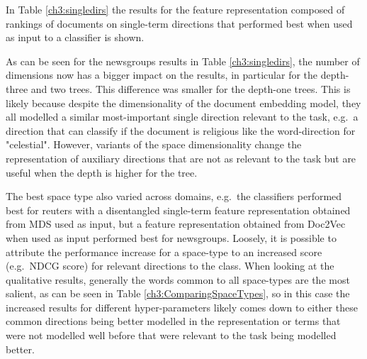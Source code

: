 In Table \ref{ch3:singledirs} the results for the feature representation composed of rankings of documents on single-term directions that performed best when used as input to a classifier is shown.



 
 As can be seen for the newsgroups results in Table \ref{ch3:singledirs}, the number of dimensions now has a bigger impact on the results, in particular for the depth-three and two trees. This difference was smaller for the depth-one trees. This is likely because despite the dimensionality of the document embedding model, they all modelled a similar most-important single direction relevant to the task, e.g.\ a direction that can classify if the document is religious like the word-direction for "celestial". However, variants of the space dimensionality change the representation of auxiliary directions that are not as relevant to the task but are useful when the depth is higher for the tree.
 
 
The best space type also varied across domains, e.g.\ the classifiers performed best for reuters with a disentangled single-term feature representation obtained from MDS used as input, but a feature representation obtained from Doc2Vec when used as input performed best for newsgroups. Loosely, it is possible to attribute the performance increase for a space-type to an increased score (e.g.\ NDCG score) for relevant directions to the class. When looking at the qualitative results, generally the words common to all space-types are the most salient, as can be seen in Table \ref{ch3:ComparingSpaceTypes}, so in this case the increased results for different hyper-parameters likely comes down to either these common directions being better modelled in the representation or terms that were not modelled well before that were relevant to the task being modelled better.
 
 
